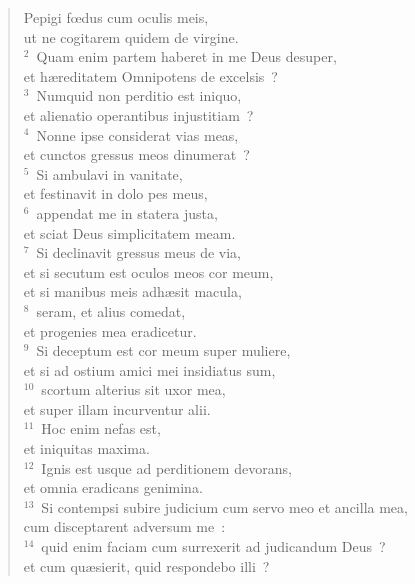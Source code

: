 \begin{flushleft}\begin{verse}\vspace{-19pt}\hspace{6pt}Pepigi fœdus cum oculis meis,\\\hspace{6pt} ut ne cogitarem quidem de virgine.\\
${}^{2}$~Quam enim partem haberet in me Deus desuper,\\ et h\ae reditatem Omnipotens de excelsis~?\\
${}^{3}$~Numquid non perditio est iniquo,\\ et alienatio operantibus injustitiam~?\\
${}^{4}$~Nonne ipse considerat vias meas,\\ et cunctos gressus meos dinumerat~?\\
${}^{5}$~Si ambulavi in vanitate,\\ et festinavit in dolo pes meus,\\
${}^{6}$~appendat me in statera justa,\\ et sciat Deus simplicitatem meam.\\
${}^{7}$~Si declinavit gressus meus de via,\\ et si secutum est oculos meos cor meum,\\ et si manibus meis adh\ae sit macula,\\
${}^{8}$~seram, et alius comedat,\\ et progenies mea eradicetur.\\
${}^{9}$~Si deceptum est cor meum super muliere,\\ et si ad ostium amici mei insidiatus sum,\\
${}^{10}$~scortum alterius sit uxor mea,\\ et super illam incurventur alii.\\
${}^{11}$~Hoc enim nefas est,\\ et iniquitas maxima.\\
${}^{12}$~Ignis est usque ad perditionem devorans,\\ et omnia eradicans genimina.\\
${}^{13}$~Si contempsi subire judicium cum servo meo et ancilla mea,\\ cum disceptarent adversum me~:\\
${}^{14}$~quid enim faciam cum surrexerit ad judicandum Deus~?\\ et cum qu\ae sierit, quid respondebo illi~?\\

\end{verse}
\end{flushleft}
